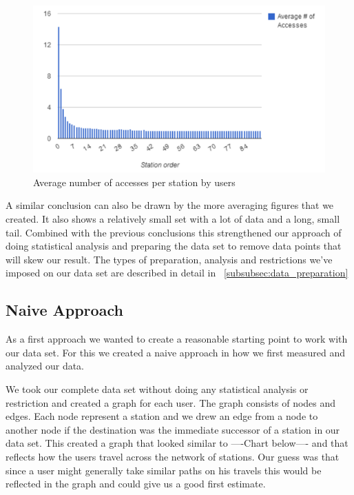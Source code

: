 \begin{figure}[!ht]
	\caption{Average number of accesses per station by users}
	\centering
	\includegraphics[width=1.0\textwidth]{charts/number_stations_average_user}
\end{figure}

A similar conclusion can also be drawn by the more averaging figures that we created. It also shows a relatively small set with a lot of data and a long, small tail. Combined with the previous conclusions this strengthened our approach of doing statistical analysis and preparing the data set to remove data points that will skew our result. The types of preparation, analysis and restrictions we've imposed on our data set are described in detail in ~\ref{subsubsec:data_preparation}

\subsection{Naive Approach}

As a first approach we wanted to create a reasonable starting point to work with our data set. For this we created a naive approach in how we first measured and analyzed our data. 

We took our complete data set without doing any statistical analysis or restriction and created a graph for each user. The graph consists of nodes and edges. Each node represent a station and we drew an edge from a node to another node if the destination was the immediate successor of a station in our data set. This created a graph that looked similar to ----Chart below---- and that reflects how the users travel across the network of stations. Our guess was that since a user might generally take similar paths on his travels this would be reflected in the graph and could give us a good first estimate.

